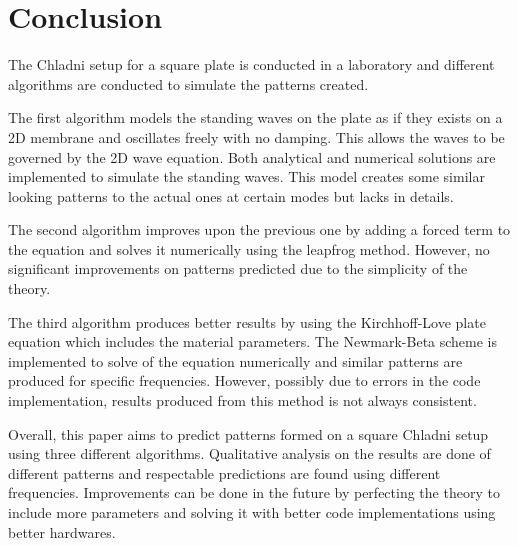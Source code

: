 \section{Conclusion}
The Chladni setup for a square plate is conducted in a laboratory and different algorithms are conducted to simulate the patterns created.

The first algorithm models the standing waves on the plate as if they exists on a 2D membrane and oscillates freely with no damping. This allows the waves to be governed by the 2D wave equation. Both analytical and numerical solutions are implemented to simulate the standing waves. This model creates some similar looking patterns to the actual ones at certain modes but lacks in details.

The second algorithm improves upon the previous one by adding a forced term to the equation and solves it numerically using the leapfrog method. However, no significant improvements on patterns predicted due to the simplicity of the theory.

The third algorithm produces better results by using the Kirchhoff-Love plate equation which includes the material parameters. The Newmark-Beta scheme is implemented to solve of the equation numerically and similar patterns are produced for specific frequencies. However, possibly due to errors in the code implementation, results produced from this method is not always consistent.

Overall, this paper aims to predict patterns formed on a square Chladni setup using three different algorithms. Qualitative analysis on the results are done of different patterns and respectable predictions are found using different frequencies. Improvements can be done in the future by perfecting the theory to include more parameters and solving it with better code implementations using better hardwares.